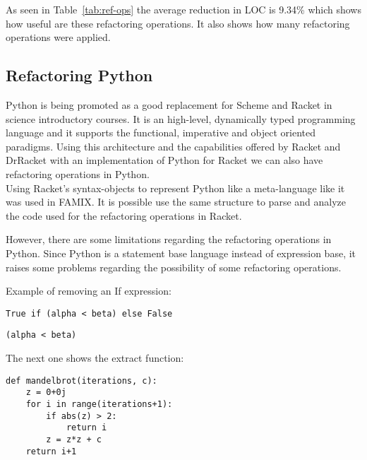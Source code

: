 As seen in Table~\ref{tab:ref-ops} the average reduction in LOC is 9.34\% which
shows how useful are these refactoring operations. It also shows how many
refactoring operations were applied.

\subsection{Refactoring Python}
Python is being promoted as a good replacement for Scheme and Racket in science introductory courses.
It is an high-level, dynamically typed programming language and it supports the functional, imperative and object
oriented paradigms.
Using this architecture and the capabilities offered by Racket and DrRacket with an implementation of Python for Racket\cite{ramos2014implementation} \cite{ramos2014reaching}
we can also have refactoring operations in Python. \\
Using Racket's syntax-objects to represent Python like a meta-language like it was used in FAMIX\cite{tichelaar2000meta}.
It is possible use the same structure to parse and analyze the code used for the refactoring operations in Racket.

However, there are some limitations regarding the refactoring operations in Python.
Since Python is a statement base language instead of expression base, it raises
some problems regarding the possibility of some refactoring operations.

Example of removing an If expression:
\lstset{style=python}
\begin{lstlisting}
True if (alpha < beta) else False
\end{lstlisting}

\begin{lstlisting}
(alpha < beta)
\end{lstlisting}

The next one shows the extract function:

\begin{lstlisting}
def mandelbrot(iterations, c):
    z = 0+0j
    for i in range(iterations+1):
        if abs(z) > 2:
            return i
        z = z*z + c
    return i+1
\end{lstlisting}

